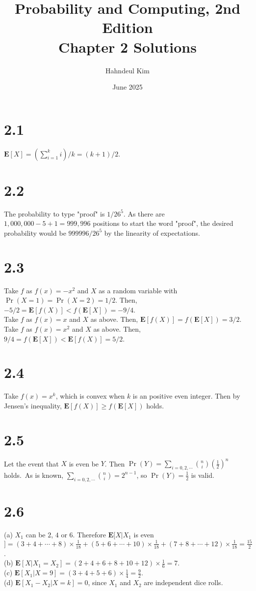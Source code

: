 \documentclass{article}
\title {Probability and Computing, 2nd Edition \\[2ex] \large Chapter 2 Solutions}
\author{Hahndeul Kim}
\date{June 2025}
\begin{document}
\maketitle
\newpage
\section*{2.1}
$\textbf{E}[X]=\left(\sum\limits_{i=1}^ki\right)/k=(k+1)/2$.
\section*{2.2}
The probability to type "proof" is $1/26^5$. As there are $1,000,000-5+1=999,996$ positions to start the word "proof", the desired probability would be $999996/26^5$ by the linearity of expectations.
\section*{2.3}
Take $f$ as $f(x)=-x^2$ and $X$ as a random variable with $\Pr(X=1)=\Pr(X=2)=1/2$. Then, $-5/2=\textbf{E}[f(X)]<f(\textbf{E}[X])=-9/4$.\\
Take $f$ as $f(x)=x$ and $X$ as above. Then, $\textbf{E}[f(X)]=f(\textbf{E}[X])=3/2$.\\
Take $f$ as $f(x)=x^2$ and $X$ as above. Then, $9/4=f(\textbf{E}[X])<\textbf{E}[f(X)]=5/2$.
\section*{2.4}
Take $f(x)=x^k$, which is convex when $k$ is an positive even integer.
Then by Jensen's inequality, $\textbf{E}[f(X)] \geq f(\textbf{E}[X])$ holds.
\section*{2.5}
Let the event that $X$ is even be $Y$. Then $\Pr(Y)=\sum\limits_{i=0,2,\cdots}\binom{n}{i}(\frac{1}{2})^n$ holds.\
As is known, $\sum\limits_{i=0,2,\cdots}\binom{n}{i}=2^{n-1}$, so $\Pr(Y)={\frac{1}{2}}$ is valid.
\section*{2.6}
(a) $X_1$ can be $2$, $4$ or $6$. Therefore $\textbf{E}[X|X_1$ is even$] = (3+4+\cdots+8)\times \frac{1}{18}+(5+6+\cdots+10)\times \frac{1}{18}+(7+8+\cdots+12)\times \frac{1}{18}=\frac{15}{2}$.\\
(b) $\textbf{E}[X|X_1 = X_2]=(2+4+6+8+10+12)\times\frac{1}{6}=7$.\\
(c) $\textbf{E}[X_1|X=9]=(3+4+5+6)\times\frac{1}{4}=\frac{9}{2}$.\\
(d) $\textbf{E}[X_1 - X_2|X=k]=0$, since $X_1$ and $X_2$ are independent dice rolls.
\end{document}
